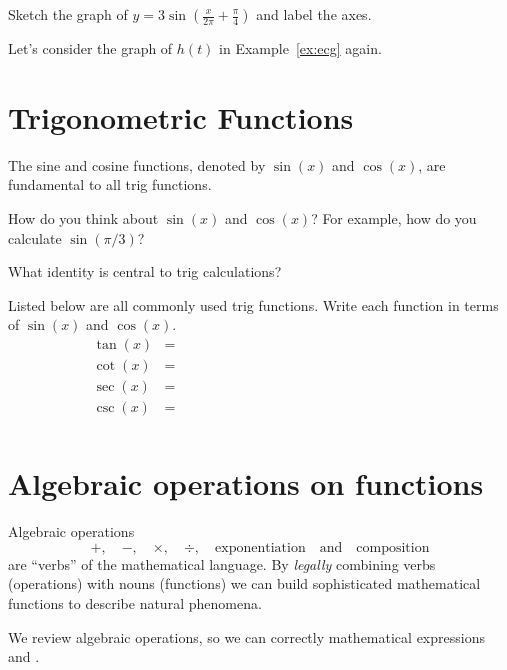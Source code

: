 \documentclass[../main.tex]{subfiles}
\begin{document}
\begin{example}
  Sketch the graph of \(y = 3 \sin\left(\frac{x}{2\pi} + \frac{\pi}{4}\right)\) and label the axes.
\end{example}

\begin{example}
  Let's consider the graph of \(h(t)\) in Example~\ref{ex:ecg} again. 
\end{example}

\section{Trigonometric Functions}

The sine and cosine functions, denoted by \(\sin(x)\) and \(\cos(x)\), are fundamental to all trig functions. 

How do you think about \(\sin(x)\) and \(\cos(x)\)? For example, how do you calculate \(\sin(\pi/3)\)?



What identity is central to  trig calculations?

Listed below are all commonly used trig functions. Write each function in terms of \(\sin(x)\) and \(\cos(x)\).
\begin{align*}
  \tan(x) &= \hspace{3in} \\[2ex]
  \cot(x) &= \hspace{3in} \\[2ex]
  \sec(x) &= \hspace{3in} \\[2ex]
  \csc(x) &= \hspace{3in} \\[2ex]
\end{align*}


\section{Algebraic operations on functions}

Algebraic operations \[+, \quad -, \quad \times, \quad \div, \quad \text{exponentiation} \quad\text{and}\quad \text{composition}\] are ``verbs'' of the mathematical language. By \emph{legally} combining verbs (operations) with nouns (functions) we can build sophisticated mathematical functions to describe natural phenomena. 

We review algebraic operations, so we can correctly  mathematical expressions and . 
\end{document}
